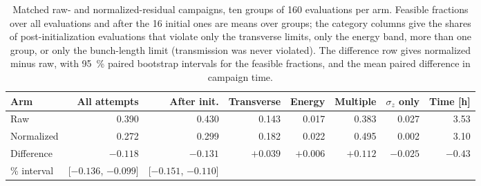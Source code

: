 \begin{table}[htbp]
\centering
\caption{Matched raw- and normalized-residual campaigns, ten groups of 160 evaluations per arm.
Feasible fractions over all evaluations and after the 16 initial ones are means over groups; the
category columns give the shares of post-initialization evaluations that violate only the
transverse limits, only the energy band, more than one group, or only the bunch-length limit
(transmission was never violated). The difference row gives normalized minus raw, with
\SI{95}{\percent} paired bootstrap intervals for the feasible fractions, and the mean paired
difference in campaign time.}
\label{tab:scaling}
\footnotesize
\setlength{\tabcolsep}{4pt}
\begin{tabular}{lrrrrrrr}
\toprule
Arm & All attempts & After init. & Transverse & Energy & Multiple & $\sigma_z$ only & Time [h] \\
\midrule
Raw & 0.390 & 0.430 & 0.143 & 0.017 & 0.383 & 0.027 & 3.53 \\
Normalized & 0.272 & 0.299 & 0.182 & 0.022 & 0.495 & 0.002 & 3.10 \\
\midrule
Difference & $-0.118$ & $-0.131$ & $+0.039$ & $+0.006$ & $+0.112$ & $-0.025$ & $-0.43$ \\
\quad 95\% interval & [$-0.136$, $-0.099$] & [$-0.151$, $-0.110$] & & & & & \\
\bottomrule
\end{tabular}
\end{table}
